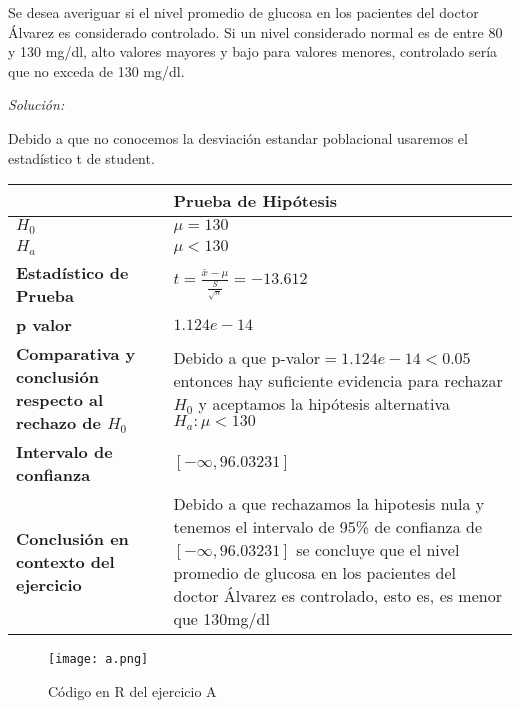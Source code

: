 \documentclass[12pt]{article}
\newenvironment{problem}[2][Problema]{\begin{trivlist}
\item[\hskip \labelsep {\bfseries #1}\hskip \labelsep {\bfseries #2.}]}{\end{trivlist}}
\newenvironment{sol}
    {\emph{Solución:}
    }
    {
    }
\begin{document}
\pagebreak
\begin{problem}{A} 
Se desea averiguar si el nivel promedio de glucosa en los pacientes del doctor Álvarez es considerado controlado. Si un nivel considerado normal es de entre 80 y 130 mg/dl, alto valores mayores y bajo para valores menores, controlado sería que no exceda de 130 mg/dl.
\end{problem}

\begin{sol}
Debido a que no conocemos la desviación estandar poblacional usaremos el estadístico t de student.
\begin{table}[h!]
\centering
\begin{tabular}{|>{\raggedright\arraybackslash}m{6cm}|>{\raggedright\arraybackslash}m{6cm}|}
\hline
 & \textbf{Prueba de Hipótesis} \\ \hline
$H_0$ & $\mu=130$ \\ \hline
$H_a$ & $\mu<130$ \\ \hline
\textbf{Estadístico de Prueba} & \vspace{0.5cm}$t=\frac{\bar{x}-\mu}{\frac{S}{\sqrt{n}}}=-13.612$\vspace{0.5cm} \\ \hline
\textbf{p valor} & $1.124e-14$ \\ \hline
\textbf{Comparativa y conclusión respecto al rechazo de $H_0$} & Debido a que p-valor$=1.124e-14<0.05$ entonces hay suficiente evidencia para rechazar $H_0$ y aceptamos la hipótesis alternativa $H_a: \mu<130$ \\ \hline
\textbf{Intervalo de confianza} & $[-\infty,96.03231]$ \\ \hline
\textbf{Conclusión en contexto del ejercicio} & Debido a que rechazamos la hipotesis nula y tenemos el intervalo de 95\% de confianza de $[-\infty,96.03231]$ se concluye que el nivel promedio de glucosa en los pacientes del doctor Álvarez es controlado, esto es, es menor que 130mg/dl \\ \hline
\end{tabular}
\label{tab:hipotesis}
\end{table}

\begin{figure}[h]  %
    \centering      %
    \texttt{[image: a.png]} 
    \caption{Código en R del ejercicio A}
\end{figure}

\end{sol}
\end{document}
